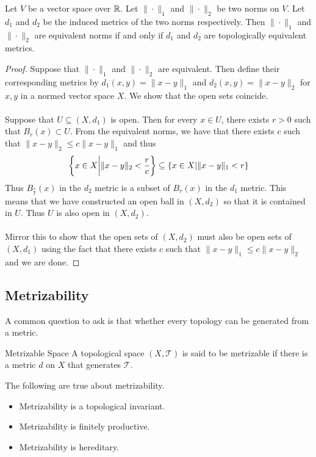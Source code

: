\documentclass[a4paper]{article}
\begin{document}
\begin{prp}{}{} Let $V$ be a vector space over $\mathbb{R}$. Let $\|\cdot\|_1$ and $\|\cdot\|_2$ be two norms on $V$. Let $d_1$ and $d_2$ be the induced metrics of the two norms respectively. Then $\|\cdot\|_1$ and $\|\cdot\|_2$ are equivalent norms if and only if $d_1$ and $d_2$ are topologically equivalent metrics. \tcbline
\begin{proof}
Suppose that $\|\cdot\|_1$ and $\|\cdot\|_2$ are equivalent. Then define their corresponding metrics by $d_1(x,y)=\|x-y\|_1$ and $d_2(x,y)=\|x-y\|_2$ for $x,y$ in a normed vector space $X$. We show that the open sets coincide. \\~\\
Suppose that $U\subseteq(X,d_1)$ is open. Then for every $x\in U$, there exists $r>0$ such that $B_r(x)\subset U$. From the equivalent norms, we have that there exists $c$ such that $\|x-y\|_2\leq c\|x-y\|_1$ and thus $$\left\{x\in X\bigg{|}\|x-y\|_2<\frac{r}{c}\right\}\subseteq\{x\in X|\|x-y\|_1<r\}$$ Thus $B_{\frac{r}{c}}(x)$ in the $d_2$ metric is a subset of $B_r(x)$ in the $d_1$ metric. This means that we have constructed an open ball in $(X,d_2)$ so that it is contained in $U$. Thus $U$ is also open in $(X,d_2)$. \\~\\
Mirror this to show that the open sets of $(X,d_2)$ must also be open sets of $(X,d_1)$ using the fact that there exists $c$ such that $\|x-y\|_1\leq c\|x-y\|_2$ and we are done. 
\end{proof}
\end{prp}

\subsection{Metrizability}
A common question to ask is that whether every topology can be generated from a metric. 
\begin{defn}{Metrizable Space}{} A topological space $(X,\mathcal{T})$ is said to be metrizable if there is a metric $d$ on $X$ that generates $\mathcal{T}$. 
\end{defn}

\begin{prp}{}{} The following are true about metrizability. 
\begin{itemize}
\item Metrizability is a topological invariant. 
\item Metrizability is finitely productive. 
\item Metrizability is hereditary. 
\end{itemize}
\end{prp}
\end{document}
